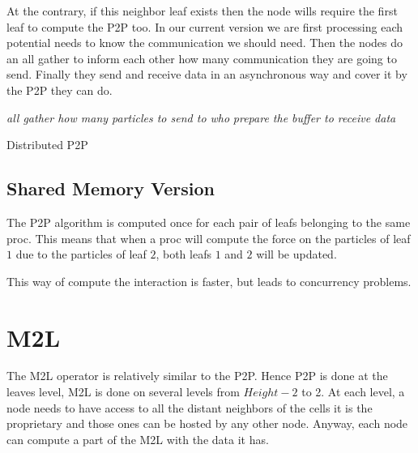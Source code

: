 \documentclass[12pt,letterpaper,titlepage]{report}
\begin{document}
At the contrary, if this neighbor leaf exists then the node wills require the first leaf to compute the P2P too.
In our current version we are first processing each potential needs to know the communication we should need.
Then the nodes do an all gather to inform each other how many communication they are going to send.
Finally they send and receive data in an asynchronous way and cover it by the P2P they can do.
\BlankLine
\begin{algorithm}[H]
  \LinesNumbered
  \SetAlgoLined
  \BlankLine
  \emph{all gather how many particles to send to who}\;
  \emph{prepare the buffer to receive data}\;
  \BlankLine
  \caption{Distributed P2P}
\end{algorithm}

\subsection{Shared Memory Version}
The P2P algorithm is computed once for each pair of leafs belonging to
the same proc. This means that when a proc will compute the force on
the particles of leaf $1$ due to the particles of leaf $2$, both leafs
$1$ and $2$ will be updated.

This way of compute the interaction is faster, but leads to
concurrency problems.


\section{M2L}
The M2L operator is relatively similar to the P2P.
Hence P2P is done at the leaves level, M2L is done on several levels from $Height - 2$ to 2.
At each level, a node needs to have access to all the distant neighbors of the cells it is the proprietary and those ones can be hosted by any other node.
Anyway, each node can compute a part of the M2L with the data it has.
\end{document}
